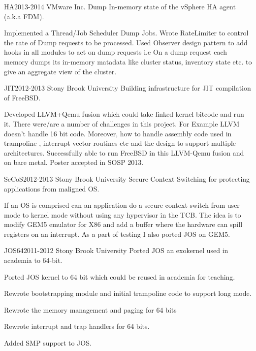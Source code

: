 \documentclass[10pt]{article} %
\begin{document}
\project
{HA}{2013-2014}
{VMware Inc.}
{Dump In-memory state of the vSphere HA agent (a.k.a FDM).}
{\begin{itemize-noindent}
\item{Implemented a Thread/Job Scheduler Dump Jobs. Wrote RateLimiter
to control the rate of Dump requests to be processed. Used Observer
design pattern to add hooks in all modules to act on dump requests i.e
On a dump request each memory dumps its in-memory matadata like cluster
status, inventory state etc. to give an aggregate view of the cluster.
}
\end{itemize-noindent}}

\project
{JIT}{2012-2013}
{Stony Brook University}
{Building infrastructure for JIT compilation of FreeBSD.}
{\begin{itemize-noindent}
\item{Developed LLVM+Qemu fusion which could take linked kernel bitcode and run it. There were/are a number of challenges in this project. For Example LLVM doesn’t handle 16 bit code. Moreover, how to handle assembly code used in trampoline , interrupt vector routines etc and the design to support multiple architectures. Successfully able to run FreeBSD in this LLVM-Qemu fusion and on bare metal. Poster accepted in SOSP 2013.}
\end{itemize-noindent}}

\project
{SeCoS}{2012-2013}
{Stony Brook University}
{Secure Context Switching for protecting applications from maligned OS.}
{\begin{itemize-noindent}
\item{If an OS is comprised can an application do a secure context switch from user mode to kernel mode without using any hypervisor in the TCB. The idea is to modify GEM5 emulator for X86 and add a buffer where the hardware can spill registers on an interrupt. As a part of testing I also ported JOS on GEM5.}
\end{itemize-noindent}}

\project
{JOS64}{2011-2012}
{Stony Brook University}
{Ported JOS an exokernel used in academia to 64-bit.}
{\begin{itemize-noindent}
\item{Ported JOS kernel to 64 bit which could be reused in academia for teaching.}
\item{Rewrote bootstrapping module and initial trampoline code to support long mode.}
\item{Rewrote the memory management and paging for 64 bits}
\item{Rewrote interrupt and trap handlers for 64 bits.}
\item{Added SMP support to JOS.}
\end{itemize-noindent}}
\end{document}
